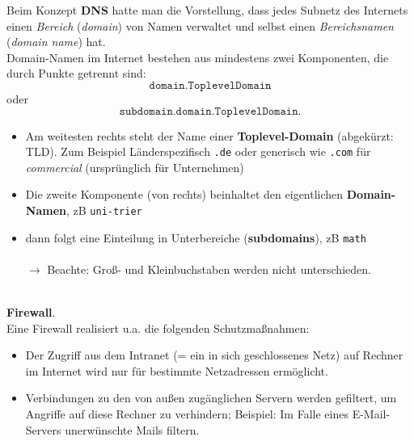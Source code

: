 Beim Konzept \textbf{DNS} hatte man die Vorstellung, dass jedes Subnetz des Internets einen \textit{Bereich} (\textit{domain}) von Namen verwaltet und selbst einen \textit{Bereichsnamen} (\textit{domain name}) hat.
~\\
Domain-Namen im Internet bestehen aus mindestens zwei Komponenten, die durch Punkte getrennt sind:
$$\texttt{domain.ToplevelDomain}$$
oder 
$$\texttt{subdomain.domain.ToplevelDomain}.$$
\begin{itemize}
	\item Am weitesten rechts steht der Name einer \textbf{Toplevel-Domain} (abgekürzt: TLD). Zum Beispiel Länderspezifisch \texttt{.de} oder generisch wie \texttt{.com} für \textit{commercial} (ursprünglich für Unternehmen)
	\item  Die zweite Komponente (von rechts) beinhaltet den eigentlichen \textbf{Domain-Namen}, zB \texttt{uni-trier}
	\item dann folgt eine Einteilung in Unterbereiche (\textbf{subdomains}), zB \texttt{math}\\~\\
	$\to$ Beachte: Groß- und Kleinbuchstaben werden nicht unterschieden. 
\end{itemize}


~\\
\textbf{Firewall}. \\
Eine Firewall realisiert u.a. die folgenden Schutzmaßnahmen:
\begin{itemize}
	\item Der Zugriff aus dem Intranet (= ein in sich geschlossenes Netz) auf Rechner im Internet wird nur für bestimmte Netzadressen ermöglicht. 
	\item Verbindungen zu den von außen zugänglichen Servern werden gefiltert, um Angriffe auf diese Rechner zu verhindern; Beispiel: Im Falle eines E-Mail-Servers unerwünschte Mails filtern.
\end{itemize}


